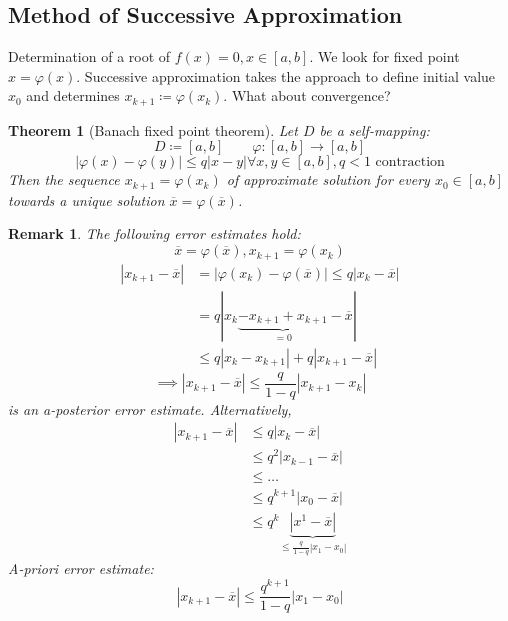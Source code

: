 \documentclass{article}
\newtheorem{theorem}{Theorem}
\newtheorem*{remark}{Remark}
\newcommand{\card}[1]{\left|#1\right|}
\begin{document}
\subsection{Method of Successive Approximation}

Determination of a root of $f(x) = 0, x \in [a,b]$.
We look for fixed point $x = \varphi(x)$.
Successive approximation takes the approach to define initial value $x_0$
and determines $x_{k+1} \coloneqq \varphi(x_k)$. What about convergence?

\begin{theorem}[Banach fixed point theorem] Let $D$ be a self-mapping:
  \[ D \coloneqq [a,b] \qquad \varphi: [a,b] \to [a,b] \]
  \[ \card{\varphi(x) - \varphi(y)} \leq q \card{x - y} \forall x,y \in [a,b], q < 1 \text{ contraction} \]
  Then the sequence $x_{k+1} = \varphi(x_k)$ of approximate solution for every $x_0 \in [a,b]$ towards a unique
  solution $\overline x = \varphi(\overline x)$.
\end{theorem}
\begin{remark}
  The following error estimates hold:
  \[ \overline x = \varphi(\overline x), x_{k+1} = \varphi(x_k) \]
  \begin{align*}
    \card{x_{k+1} - \overline{x}} &= \card{\varphi(x_k) - \varphi(\overline x)} \leq q \card{x_k - \overline x} \\
      &= q \card{x_k \underbrace{- x_{k+1} + x_{k+1}}_{=0} - \overline x} \\
      &\leq q \card{x_k - x_{k+1}} + q \card{x_{k+1} - \overline x}
  \end{align*}
  \[ \implies \card{x_{k+1} - \overline x} \leq \frac{q}{1 - q} \card{x_{k+1} - x_k} \]
  is an a-posterior error estimate. Alternatively,
  \begin{align*}
    \card{x_{k+1} - \overline x} &\leq q \card{x_k - \overline x} \\
      &\leq q^2 \card{x_{k-1} - \overline x} \\
      &\leq \ldots \\
      &\leq q^{k+1} \card{x_0 - \overline x} \\
      &\leq q^k \underbrace{\card{x^1 - \overline x}}_{\leq \frac{q}{1-q} \card{x_1 - x_0}}
  \end{align*}
  A-priori error estimate:
  \[ \card{x_{k+1} - \overline x} \leq \frac{q^{k+1}}{1 - q} \card{x_1 - x_0} \]
\end{remark}
\end{document}

